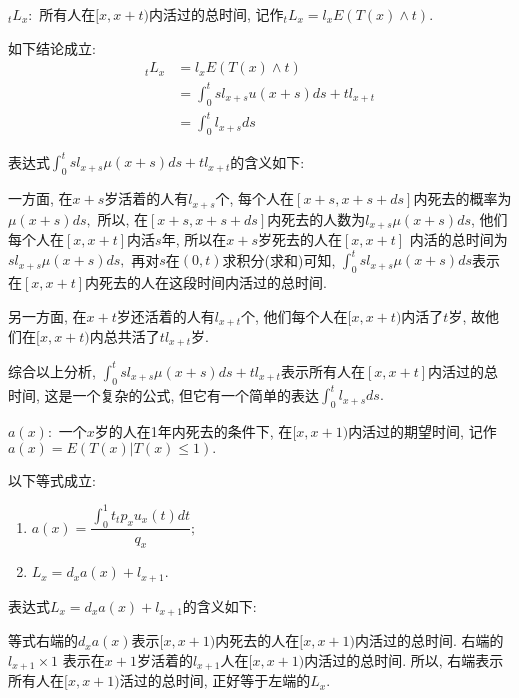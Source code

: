 \documentclass[lang=cn,10pt]{elegantbook}
\begin{document}
\begin{definition}
	${}_tL_x:$ 所有人在$[x,x+t)$内活过的总时间, 记作$ {}_tL_x=l_xE(T(x)\wedge t).$
\end{definition}

\begin{corollary} 如下结论成立:
    \begin{align*}
        {}_tL_x & =l_xE(T(x)\wedge t)                 \\
                & =\int_0^t sl_{x+s}u(x+s)ds+tl_{x+t} \\
                & =\int_0^tl_{x+s}ds
    \end{align*}
\end{corollary}

\begin{remark}
	表达式$\int_0^tsl_{x+s}\mu(x+s)ds+tl_{x+t}$的含义如下:

	一方面, 在$x+s$岁活着的人有$l_{x+s}$个, 每个人在$[x+s,x+s+ds]$内死去的概率为$\mu(x+s)ds,$ 所以, 在$[x+s,x+s+ds]$内死去的人数为$l_{x+s}\mu(x+s)ds$, 他们每个人在$[x,x+t]$内活$s$年, 所以在$x+s$岁死去的人在$[x,x+t]$ 内活的总时间为$sl_{x+s}\mu(x+s)ds,$ 再对$s$在$(0,t)$求积分(求和)可知, $\int_0^tsl_{x+s}\mu(x+s)ds$表示在$[x,x+t]$内死去的人在这段时间内活过的总时间. 
	
	另一方面, 在$x+t$岁还活着的人有$l_{x+t}$个, 他们每个人在$[x,x+t)$内活了$t$岁, 故他们在$[x,x+t)$内总共活了$tl_{x+t}$岁.

	综合以上分析, $\int_0^tsl_{x+s}\mu(x+s)ds+tl_{x+t}$表示所有人在$[x,x+t]$内活过的总时间, 这是一个复杂的公式, 但它有一个简单的表达$\int_0^tl_{x+s}ds.$
\end{remark}

\begin{definition}
	$a(x):$ 一个$x$岁的人在1年内死去的条件下, 在$[x,x+1)$内活过的期望时间, 记作$a(x)=E(T(x)|T(x)\leq 1).$
\end{definition}

\begin{corollary}以下等式成立:
    \begin{enumerate}
		\item $a(x)=\dfrac {\int_0^1t{}_tp_xu_x(t)dt}{q_x};$
		\item $L_x=d_xa(x)+l_{x+1}.$
	\end{enumerate} 
\end{corollary}

\begin{remark}
	表达式$L_x=d_xa(x)+l_{x+1}$的含义如下:
   
	等式右端的$d_xa(x)$表示$[x,x+1)$内死去的人在$[x,x+1)$内活过的总时间. 右端的$l_{x+1}\times1$ 表示在$x+1$岁活着的$l_{x+1}$人在$[x,x+1)$内活过的总时间. 所以, 右端表示所有人在$[x,x+1)$活过的总时间, 正好等于左端的$L_x.$
   \end{remark}
\end{document}
